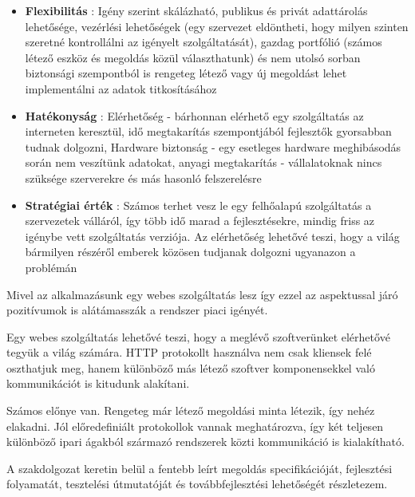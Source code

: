  \begin{itemize}
	\item \textbf{Flexibilitás} : Igény szerint skálázható, publikus és privát adattárolás lehetősége, vezérlési lehetőségek (egy szervezet eldöntheti, hogy milyen szinten szeretné kontrollálni az igényelt szolgáltatását), gazdag portfólió (számos létező eszköz és megoldás közül választhatunk) és nem utolsó sorban biztonsági szempontból is rengeteg létező vagy új megoldást lehet implementálni az adatok titkosításához
	\item \textbf{Hatékonyság} : Elérhetőség - bárhonnan elérhető egy szolgáltatás az interneten keresztül, idő megtakarítás szempontjából fejlesztők gyorsabban tudnak dolgozni, Hardware biztonság - egy esetleges hardware meghibásodás során nem veszítünk adatokat, anyagi megtakarítás - vállalatoknak nincs szüksége szerverekre és más hasonló felszerelésre
	\item \textbf{Stratégiai érték} : Számos terhet vesz le egy felhőalapú szolgáltatás a szervezetek válláról, így több idő marad a fejlesztésekre, mindig friss az igénybe vett szolgáltatás verziója. Az elérhetőség lehetővé teszi, hogy a világ bármilyen részéről emberek közösen tudjanak dolgozni ugyanazon a problémán
\end{itemize}

Mivel az alkalmazásunk egy webes szolgáltatás lesz így ezzel az aspektussal járó pozitívumok is alátámasszák a rendszer piaci igényét.

Egy webes szolgáltatás lehetővé teszi, hogy a meglévő szoftverünket elérhetővé tegyük a világ számára\cite{tutorialspoint}. HTTP protokollt használva nem csak kliensek felé oszthatjuk meg, hanem különböző más létező szoftver komponensekkel való kommunikációt is kitudunk alakítani.

Számos előnye van. Rengeteg már létező megoldási minta létezik, így nehéz elakadni. Jól előredefiniált protokollok vannak meghatározva, így két teljesen különböző ipari ágakból származó rendszerek közti kommunikáció is kialakítható.


A szakdolgozat keretin belül a fentebb leírt megoldás specifikációját, fejlesztési folyamatát, tesztelési útmutatóját és továbbfejlesztési lehetőségét részletezem.

